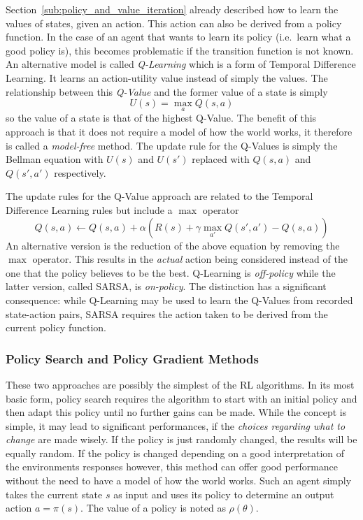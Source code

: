 Section~\ref{sub:policy_and_value_iteration} already described how to learn the values of states, given an
action. This action can also be derived from a policy function.  In the case of an agent that wants to learn its policy
(i.e.\ learn what a good policy is), this becomes problematic if the transition function is not known. An alternative
model is called \emph{Q-Learning} which is a form of Temporal Difference Learning. It learns an action-utility value
instead of simply the values. The relationship between this \emph{Q-Value} and the former value of a state is simply
\begin{equation}
    U(s) = \max_{a}Q(s,a)
\end{equation}
so the value of a state is that of the highest Q-Value. The benefit of this approach is that it does not require a model
of how the world works, it therefore is called a \emph{model-free} method. The update rule for the Q-Values is simply
the Bellman equation with $U(s)$ and $U(s')$ replaced with $Q(s,a)$ and $Q(s',a')$ respectively.

The update rules for the Q-Value approach are related to the Temporal Difference Learning rules but include a $\max$
operator
\begin{equation}
    Q(s,a) \gets Q(s,a) + \alpha(R(s) + \gamma \max_{a'}Q(s', a') - Q(s,a))
\end{equation}
An alternative version is the reduction of the above equation by removing the $\max$ operator. This results in the
\emph{actual} action being considered instead of the one that the policy believes to be the best. Q-Learning is
\emph{off-policy} while the latter version, called \ac{SARSA}, is \emph{on-policy}. The distinction has a significant
consequence: while Q-Learning may be used to learn the Q-Values from recorded state-action pairs, \ac{SARSA} requires
the action taken to be derived from the current policy function.

\subsubsection{Policy Search and Policy Gradient Methods}%
\label{sub:policy_search_and_policy_gradient_methods}

These two approaches are possibly the simplest of the \ac{RL} algorithms. In its most basic form, policy search requires
the algorithm to start with an initial policy and then adapt this policy until no further gains can be made. While the
concept is simple, it may lead to significant performances, if the \emph{choices regarding what to change} are made
wisely. If the policy is just randomly changed, the results will be equally random. If the policy is changed depending
on a good interpretation of the environments responses however, this method can offer good performance without the need
to have a model of how the world works. Such an agent simply takes the current state $s$ as input and uses its policy to
determine an output action $a = \pi(s)$. The value of a policy is noted as $\rho(\theta)$.

